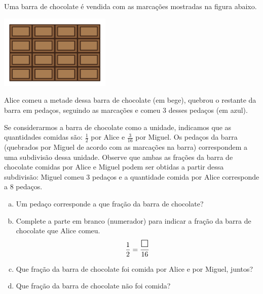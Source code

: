 \begin{atividade}[label=chap5-ativ3]{}


Uma barra de chocolate é vendida com as marcações mostradas na figura abaixo.

 \begin{center}
 \includegraphics[width=150pt, keepaspectratio]{../figuras/licao05/ativ3_fig01.png}
 \end{center}


Alice comeu a metade dessa barra de chocolate (em bege), quebrou o restante da barra em pedaços, seguindo as marcações e comeu 3 desses pedaços (em azul).

\begin{center}
\end{center}

Se considerarmos a barra de chocolate como a unidade, indicamos que as quantidades comidas são: $\frac{1}{2}$ por Alice e $\frac{3}{16}$ por Miguel.
Os pedaços da barra (quebrados por Miguel de acordo com as marcações na barra) correspondem a uma subdivisão dessa unidade.
Observe que ambas as frações da barra de chocolate comidas por Alice e Miguel podem ser obtidas a partir dessa subdivisão: Miguel comeu 3 pedaços e a quantidade comida por Alice corresponde a 8 pedaços.
\begin{enumerate}[a)]
\item Um pedaço corresponde a que fração da barra de chocolate?
\item Complete a parte em branco (numerador) para indicar a fração da barra de chocolate que Alice comeu.
$$\frac{1}{2} = \frac{\text{\Large $\square$} }{16}$$
\item Que fração da barra de chocolate foi comida por Alice e por Miguel, juntos?
\item  Que fração da barra de chocolate não foi comida?
\end{enumerate}
\end{atividade}

